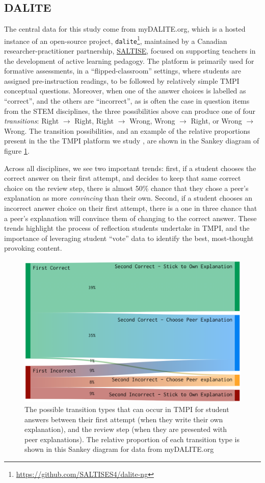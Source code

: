 \documentclass[notitlepage,12pt]{jedm}
\begin{document}
\subsection{DALITE}\label{sec:dataset_dalite}
The central data for this study come from myDALITE.org, which is a hosted 
instance of an open-source project, 
\verb|dalite|\footnote{\url{https://github.com/SALTISES4/dalite-ng}}, 
maintained by a Canadian researcher-practitioner partnership, 
\href{saltise.ca}{SALTISE}, focused on supporting teachers in the development 
of active learning pedagogy.
The platform is primarily used for formative assessments, in a 
``flipped-classroom'' settings, where students are assigned pre-instruction 
readings, to be followed by relatively simple TMPI conceptual questions.
Moreover, when one of the answer choices is labelled as ``correct'', and the 
others are ``incorrect'', as is often the case in question items from the STEM 
disciplines, the three possibilities above can produce one of four 
\textit{transitions}: Right $\rightarrow$ Right, Right $\rightarrow$ Wrong, 
Wrong $\rightarrow$ Right, or Wrong $\rightarrow$ Wrong.
The transition possibilities, and an example of the relative proportions 
present in the the TMPI platform we study \cite{bhatnagar_dataset_2020}, are 
shown in the Sankey diagram of figure \ref{fig:tmpi_sankey}.

Across all disciplines, we see two important trends: first, if a student 
chooses the correct answer on their first attempt, and decides to keep that 
same correct choice on the review step, there is almost 50\% chance that 
they chose a peer's explanation as more \textit{convincing}  than their own. 
Second, if a student chooses an incorrect answer choice on their first attempt, 
there is a one in three chance that a peer's explanation will convince them of 
changing to the correct answer.
These trends highlight the process of reflection students undertake in TMPI, 
and the importance of leveraging student ``vote'' data to identify the best, 
most-thought provoking content.

\begin{figure}[H]
	\centering
	\includegraphics[width=0.7\linewidth]{img/transitions_final.png}
	\caption{The possible transition types that can occur in TMPI for student 
		answers between their first attempt (when they write their own 
		explanation), and the review step (when they are presented with peer 
		explanations). 
		The relative proportion of each transition type is shown in this Sankey 
		diagram for data from myDALITE.org}
	\label{fig:tmpi_sankey}
\end{figure}
\end{document}
